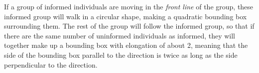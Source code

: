 If a group of informed individuals are moving in the \emph{front line} of the group, these informed group will walk in a circular shape, making a quadratic bounding box surrounding them. 
The rest of the group will follow the informed group, so that if there are the same number of uninformed individuals as informed, they will together make up a bounding box with elongation of about 2, meaning that the side of the bounding box parallel to the direction is twice as long as the side perpendicular to the direction.